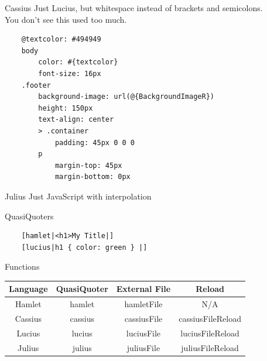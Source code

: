 \documentclass[pdf]{beamer}
\begin{document}
\begin{frame}[fragile]{Cassius}
  Just Lucius, but whitespace instead of brackets and semicolons.\\
  You don't see this used too much.\\
  \begin{verbatim}
    @textcolor: #494949
    body
        color: #{textcolor}
        font-size: 16px
    .footer
        background-image: url(@{BackgroundImageR})
        height: 150px
        text-align: center
        > .container
            padding: 45px 0 0 0
        p
            margin-top: 45px
            margin-bottom: 0px
  \end{verbatim}
\end{frame}

\begin{frame}{Julius}
  Just JavaScript with interpolation\\
\end{frame}

\begin{frame}[fragile]{QuasiQuoters}
  \begin{verbatim}
    [hamlet|<h1>My Title|]
    [lucius|h1 { color: green } |]
  \end{verbatim}
\end{frame}

\begin{frame}{Functions}
  \begin{center}
    \begin{tabular}{ |c|c|c|c| }
      \hline
      Language & QuasiQuoter & External File & Reload\\
      \hline
      Hamlet & hamlet & hamletFile & N/A\\
      \hline
      Cassius & cassius & cassiusFile & cassiusFileReload\\
      \hline
      Lucius & lucius & luciusFile & luciusFileReload\\
      \hline
      Julius & julius & juliusFile & juliusFileReload\\
      \hline
    \end{tabular}
  \end{center}
\end{frame}
\end{document}
